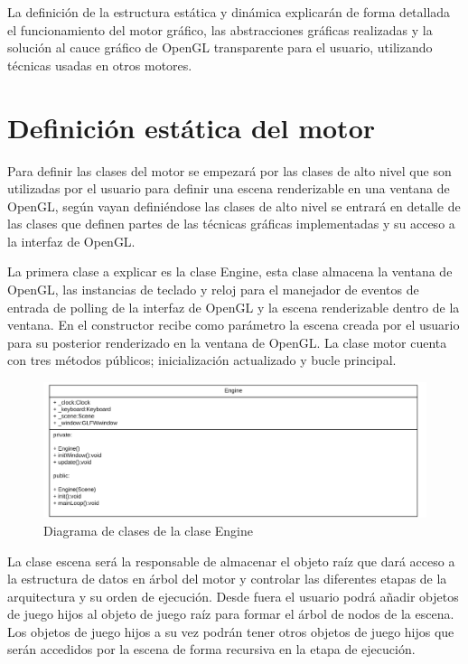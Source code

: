 \documentclass[a4paper, 17pt]{book}
\begin{document}
La definición de la estructura estática y dinámica explicarán de forma detallada el funcionamiento del motor gráfico, las
abstracciones gráficas realizadas y la solución al cauce gráfico de OpenGL transparente para el usuario, utilizando técnicas
usadas en otros motores.

\section{Definición estática del motor} 
\label{sec:estatica}

Para definir las clases del motor se empezará por las clases de alto nivel que son utilizadas por el usuario para definir una
escena renderizable en una ventana de OpenGL, según vayan definiéndose las clases de alto nivel se entrará en detalle de las
clases que definen partes de las técnicas gráficas implementadas y su acceso a la interfaz de OpenGL.

La primera clase a explicar es la clase Engine, esta clase almacena la ventana de OpenGL, las instancias de teclado y reloj
para el manejador de eventos de entrada de polling de la interfaz de OpenGL y la escena renderizable dentro de la ventana.
En el constructor recibe como parámetro la escena creada por el usuario para su posterior renderizado en la ventana de OpenGL.
La clase motor cuenta con tres métodos públicos; inicialización actualizado y bucle principal.

\begin{figure}[H]
    \centering
    \includegraphics[scale=0.20, keepaspectratio]{img/Engine.png}
    \caption{Diagrama de clases de la clase Engine}
    \label{figura:Blender}
\end{figure}

La clase escena será la responsable de almacenar el objeto raíz que dará acceso a la estructura de datos en árbol del motor y
controlar las diferentes etapas de la arquitectura y su orden de ejecución. Desde fuera el usuario podrá añadir objetos de
juego hijos al objeto de juego raíz para formar el árbol de nodos de la escena. Los objetos de juego hijos a su vez podrán
tener otros objetos de juego hijos que serán accedidos por la escena de forma recursiva en la etapa de ejecución.
\end{document}
